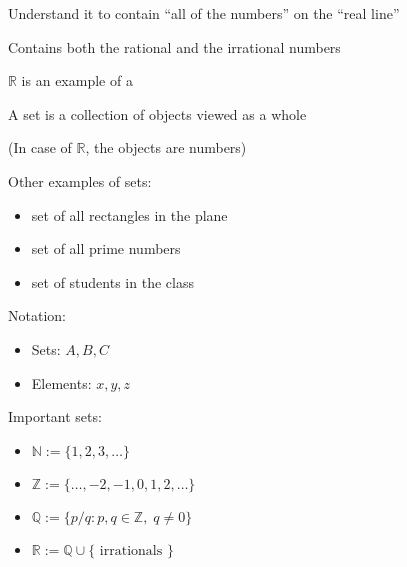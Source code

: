 \documentclass[letterpaper,10pt,english]{jupyterBook}
\begin{document}
\sphinxAtStartPar
Understand it to contain “all of the numbers” on the “real line”

\begin{figure}[htbp]
\centering

\noindent{}
\end{figure}

\sphinxAtStartPar
Contains both the rational and the irrational numbers

\sphinxAtStartPar
\(\mathbb{R}\) is an example of a 

\sphinxAtStartPar
A set is a collection of objects viewed as a whole

\sphinxAtStartPar
(In case of \(\mathbb{R}\), the objects are numbers)

\sphinxAtStartPar
Other examples of sets:
\begin{itemize}
\item {} 
\sphinxAtStartPar
set of all rectangles in the plane

\item {} 
\sphinxAtStartPar
set of all prime numbers

\item {} 
\sphinxAtStartPar
set of students in the class

\end{itemize}

\sphinxAtStartPar
Notation:
\begin{itemize}
\item {} 
\sphinxAtStartPar
Sets: \(A, B, C\)

\item {} 
\sphinxAtStartPar
Elements: \(x,y,z\)

\end{itemize}

\sphinxAtStartPar
Important sets:
\begin{itemize}
\item {} 
\sphinxAtStartPar
\(\mathbb{N} := \{1, 2, 3, \ldots \}\)

\item {} 
\sphinxAtStartPar
\(\mathbb{Z} := \{\ldots, -2, -1, 0, 1, 2, \ldots \}\)

\item {} 
\sphinxAtStartPar
\(\mathbb{Q} := \{ p/q : p, q \in \mathbb{Z}, \; q \ne 0 \}\)

\item {} 
\sphinxAtStartPar
\(\mathbb{R} := \mathbb{Q} \cup \{ \text{ irrationals } \}\)

\end{itemize}
\end{document}
